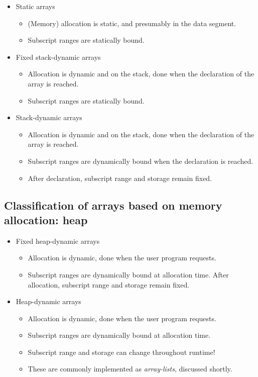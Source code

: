 \documentclass[11pt]{article}
\theoremstyle{definition}
\begin{document}
\begin{itemize}
\item Static arrays
\begin{itemize}
\item (Memory) allocation is static, and presumably in the data segment.
\item Subscript ranges are statically bound.
\end{itemize}
\item Fixed stack-dynamic arrays
\begin{itemize}
\item Allocation is dynamic and on the stack,
done when the declaration of the array is reached.
\item Subscript ranges are statically bound.
\end{itemize}
\item Stack-dynamic arrays
\begin{itemize}
\item Allocation is dynamic and on the stack,
done when the declaration of the array is reached.
\item Subscript ranges are dynamically bound when the declaration is reached.
\item After declaration, subscript range and storage remain fixed.
\end{itemize}
\end{itemize}

\subsection{Classification of arrays based on memory allocation: heap}
\label{sec:orgab9b4a1}

\begin{itemize}
\item Fixed heap-dynamic arrays
\begin{itemize}
\item Allocation is dynamic, done when the user program requests.
\item Subscript ranges are dynamically bound at allocation time.
After allocation, subscript range and storage remain fixed.
\end{itemize}
\item Heap-dynamic arrays
\begin{itemize}
\item Allocation is dynamic, done when the user program requests.
\item Subscript ranges are dynamically bound at allocation time.
\item Subscript range and storage can change throughout runtime!
\item These are commonly implemented as \emph{array-lists}, discussed shortly.
\end{itemize}
\end{itemize}
\end{document}

